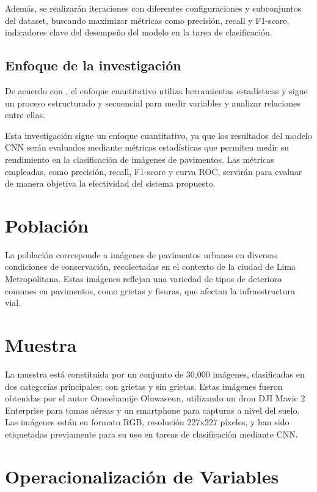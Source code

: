 Además, se realizarán iteraciones con diferentes configuraciones y subconjuntos del dataset, buscando maximizar métricas como precisión, recall y F1-score, indicadores clave del desempeño del modelo en la tarea de clasificación.

\subsection{Enfoque de la investigación}

De acuerdo con \cite{bk_sampieri2014metodologia}, el enfoque cuantitativo utiliza herramientas estadísticas y sigue un proceso estructurado y secuencial para medir variables y analizar relaciones entre ellas.

Esta investigación sigue un enfoque cuantitativo, ya que los resultados del modelo CNN serán evaluados mediante métricas estadísticas que permiten medir su rendimiento en la clasificación de imágenes de pavimentos. Las métricas empleadas, como precisión, recall, F1-score y curva ROC, servirán para evaluar de manera objetiva la efectividad del sistema propuesto.


\section{Población}

La población corresponde a imágenes de pavimentos urbanos en diversas condiciones de conservación, recolectadas en el contexto de la ciudad de Lima Metropolitana. Estas imágenes reflejan una variedad de tipos de deterioro comunes en pavimentos, como grietas y fisuras, que afectan la infraestructura vial.

\section{Muestra}

La muestra está constituida por un conjunto de 30,000 imágenes, clasificadas en dos categorías principales: con grietas y sin grietas. Estas imágenes fueron obtenidas por el autor Omoebamije Oluwaseun, utilizando un dron DJI Mavic 2 Enterprise para tomas aéreas y un smartphone para capturas a nivel del suelo. Las imágenes están en formato RGB, resolución 227x227 píxeles, y han sido etiquetadas previamente para su uso en tareas de clasificación mediante CNN.


\section{Operacionalización de Variables}

